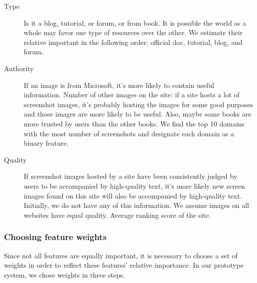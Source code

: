 \documentclass{www2010-submission}
\begin{document}
\begin{description}

\item[Type]

Is it a blog, tutorial, or forum, or from book. It is possible the
world as a whole may favor one type of resources over the other.
We estimate their relative important in the following order:
official doc, tutorial, blog, and forum.

\item[Authority]

If an image is from Microsoft, it's more likely to contain useful
information. Number of other images on the site: if a site hosts a
lot of screenshot images, it's probably hosting the images for
some good purposes and those images are more likely to be useful.
Also, maybe some books are more trusted by users than the other
books. We find the top 10 domains with the most number of
screenshots and designate each domain as a binary feature.

\item[Quality]

If screenshot images hosted by a site have been consistently
judged by users to be accompanied by high-quality text, it's more
likely new screen images found on this site will also be
accompanied by high-quality text. Initially, we do not have any of
this information. We assume images on all websites have equal
quality. Average ranking score of the site.

\end{description}

\subsubsection{Choosing feature weights}

Since not all features are equally important, it is necessary to
choose a set of weights in order to reflect these features' relative
importance. In our prototype system, we chose weights in three steps.
\end{document}
